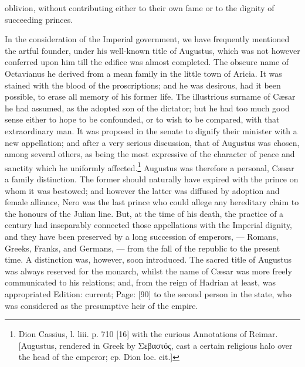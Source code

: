 oblivion, without contributing either to their own fame or to the dignity of succeeding princes.

In the consideration of the Imperial government, we have frequently mentioned the artful founder, under his well-known title of Augustus, which was not however conferred upon him till the edifice was almost completed. The obscure name of Octavianus he derived from a mean family in the little town of Aricia. It was stained with the blood of the proscriptions; and he was desirous, had it been possible, to erase all memory of his former life. The illustrious surname of Cæsar he had assumed, as the adopted son of the dictator; but he had too much good sense either to hope to be confounded, or to wish to be compared, with that extraordinary man. It was proposed in the senate to dignify their minister with a new appellation; and after a very serious discussion, that of Augustus was chosen, among several others, as being the most expressive of the character of peace and sanctity which he uniformly affected.\footnote{Dion Cassius, l. liii. p. 710 [16] with the curious Annotations of Reimar. [Augustus, rendered in Greek by \textgreek{Σεβαστός}, cast a certain religious halo over the head of the emperor; cp. Dion loc. cit.]} Augustus was therefore a personal, Cæsar a family distinction. The former should naturally have expired with the prince on whom it was bestowed; and however the latter was diffused by adoption and female alliance, Nero was the last prince who could allege any hereditary claim to the honours of the Julian line. But, at the time of his death, the practice of a century had inseparably connected those appellations with the Imperial dignity, and they have been preserved by a long succession of emperors, \texthebrew{—} Romans, Greeks, Franks, and Germans, \texthebrew{—} from the fall of the republic to the present time. A distinction was, however, soon introduced. The sacred title of Augustus was always reserved for the monarch, whilst the name of Cæsar was more freely communicated to his relations; and, from the reign of Hadrian at least, was appropriated Edition: current; Page: [90] to the second person in the state, who was considered as the presumptive heir of the empire.


